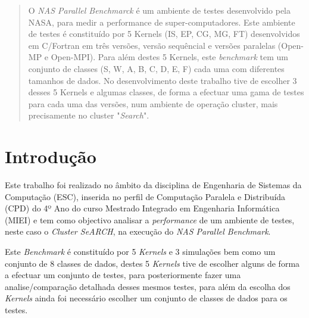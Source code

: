 \documentclass[conference,compsoc]{IEEEtran}
\begin{document}




\maketitle
\tableofcontents

\newpage
\begin{abstract}
O \textit{NAS Parallel Benchmarck} é um ambiente de testes desenvolvido pela NASA, para medir a performance de super-computadores. Este ambiente de testes é constituído por 5 Kernels (IS, EP, CG, MG, FT) desenvolvidos em C/Fortran em três versões, versão sequêncial e versões paralelas (Open-MP e Open-MPI). Para além destes 5 Kernels, este \textit{benchmark} tem um conjunto de classes (S, W, A, B, C, D, E, F) cada uma com diferentes tamanhos de dados. No desenvolvimento deste trabalho tive de escolher 3 desses 5 Kernels e algumas classes, de forma a efectuar uma gama de testes para cada uma das versões, num ambiente de operação cluster, mais precisamente no cluster "\textit{Search}". 
\end{abstract}





%
\IEEEpeerreviewmaketitle



\section{Introdução}
Este trabalho foi realizado no âmbito da disciplina de Engenharia de Sistemas da Computação (ESC), inserida no perfil de Computação Paralela e Distribuída (CPD) do 4º Ano do curso Mestrado Integrado em Engenharia Informática (MIEI) e tem como objectivo analisar a \textit{performance} de um ambiente de testes, neste caso o \textit{Cluster SeARCH}, na execução do \textit{NAS Parallel Benchmark}.


Este \textit{Benchmark} é constituído por 5 \textit{Kernels} e 3 simulações bem como um conjunto de 8 classes de dados, destes 5 \textit{Kernels} tive de escolher alguns de forma a efectuar um conjunto de testes, para posteriormente fazer uma analise/comparação detalhada desses mesmos testes, para além da escolha dos \textit{Kernels} ainda foi necessário escolher um conjunto de classes de dados para os testes.
\end{document}
